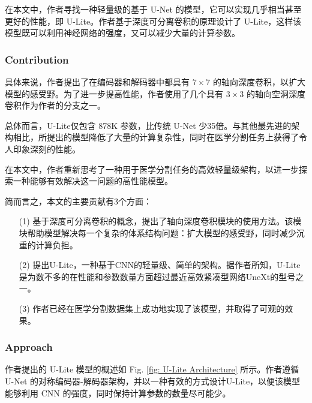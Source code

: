 \documentclass[a4paper, 10pt]{article}
\begin{document}
			在本文中，作者寻找一种轻量级的基于 U-Net 的模型，它可以实现几乎相当甚至更好的性能，即 U-Lite。作者基于深度可分离卷积的原理设计了 U-Lite，这样该模型既可以利用神经网络的强度，又可以减少大量的计算参数。
			
			\subsubsection{Contribution}
			
			具体来说，作者提出了在编码器和解码器中都具有 $7\times7$ 的轴向深度卷积，以扩大模型的感受野。为了进一步提高性能，作者使用了几个具有 $3\times3$ 的轴向空洞深度卷积作为作者的分支之一。
			
			总体而言，U-Lite仅包含 878K 参数，比传统 U-Net 少35倍。与其他最先进的架构相比，所提出的模型降低了大量的计算复杂性，同时在医学分割任务上获得了令人印象深刻的性能。
			
			在本文中，作者重新思考了一种用于医学分割任务的高效轻量级架构，以进一步探索一种能够有效解决这一问题的高性能模型。
			
			简而言之，本文的主要贡献有3个方面：

			\begin{itemize}
				\item[(1)] 基于深度可分离卷积的概念，提出了轴向深度卷积模块的使用方法。该模块帮助模型解决每一个复杂的体系结构问题：扩大模型的感受野，同时减少沉重的计算负担。
				
				\item[(2)] 提出U-Lite，一种基于CNN的轻量级、简单的架构。据作者所知，U-Lite是为数不多的在性能和参数数量方面超过最近高效紧凑型网络UneXt的型号之一。
				
				\item[(3)] 作者已经在医学分割数据集上成功地实现了该模型，并取得了可观的效果。
			\end{itemize}
			
			\subsubsection{Approach}
			
			作者提出的 U-Lite 模型的概述如 Fig. \ref{fig: U-Lite Architecture} 所示。作者遵循 U-Net 的对称编码器-解码器架构，并以一种有效的方式设计U-Lite，以便该模型能够利用 CNN 的强度，同时保持计算参数的数量尽可能少。
			
\end{document}
